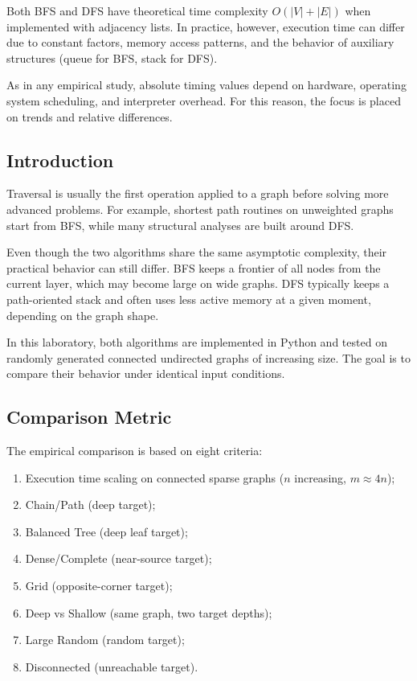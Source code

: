 \documentclass{labreport}
\begin{document}
Both BFS and DFS have theoretical time complexity $O(|V|+|E|)$ when implemented with adjacency lists. In practice, however, execution time can differ due to constant factors, memory access patterns, and the behavior of auxiliary structures (queue for BFS, stack for DFS).

As in any empirical study, absolute timing values depend on hardware, operating system scheduling, and interpreter overhead. For this reason, the focus is placed on trends and relative differences.

\subsection{Introduction}
Traversal is usually the first operation applied to a graph before solving more advanced problems. For example, shortest path routines on unweighted graphs start from BFS, while many structural analyses are built around DFS.

Even though the two algorithms share the same asymptotic complexity, their practical behavior can still differ. BFS keeps a frontier of all nodes from the current layer, which may become large on wide graphs. DFS typically keeps a path-oriented stack and often uses less active memory at a given moment, depending on the graph shape.

In this laboratory, both algorithms are implemented in Python and tested on randomly generated connected undirected graphs of increasing size. The goal is to compare their behavior under identical input conditions.

\subsection{Comparison Metric}
The empirical comparison is based on eight criteria:
\begin{enumerate}
    \item Execution time scaling on connected sparse graphs ($n$ increasing, $m \approx 4n$);
    \item Chain/Path (deep target);
    \item Balanced Tree (deep leaf target);
    \item Dense/Complete (near-source target);
    \item Grid (opposite-corner target);
    \item Deep vs Shallow (same graph, two target depths);
    \item Large Random (random target);
    \item Disconnected (unreachable target).
\end{enumerate}
\end{document}
